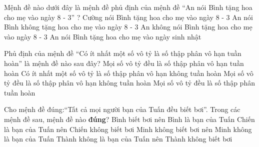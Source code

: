 \begin{ex}%
	Mệnh đề nào dưới đây là mệnh đề phủ định của mệnh đề ``An nói Bình tặng hoa cho mẹ vào ngày 8 - 3'' ?
	\choice
	{Cường nói Bình tặng hoa cho mẹ vào ngày 8 - 3}
	{An nói Bình không tặng hoa cho mẹ vào ngày 8 - 3}
	{\True An không nói Bình tặng hoa cho mẹ vào ngày 8 - 3}
	{An nói Bình tặng hoa cho mẹ vào ngày sinh nhật}
\end{ex}

\begin{ex}%
	Phủ định của mệnh đề ``Có ít nhất một số vô tỷ là số thập phân vô hạn tuần hoàn'' là mệnh đề nào sau đây?
	\choice 
	{Mọi số vô tỷ đều là số thập phân vô hạn tuần hoàn} 
	{Có ít nhất một số vô tỷ là số thập phân vô hạn không tuần hoàn} 
	{\True Mọi số vô tỷ đều là số thập phân vô hạn không tuần hoàn} 
	{Mọi số vô tỷ đều là số thập phân tuần hoàn} 
\end{ex} 

\begin{ex}%
	Cho mệnh đề đúng:``Tất cả mọi người bạn của Tuấn đều biết bơi''. Trong các mệnh đề sau, mệnh đề nào \textbf{đúng}?
	\choice
	{Bình biết bơi nên Bình là bạn của Tuấn}
	{Chiến là bạn của Tuấn nên Chiến không biết bơi }
	{\True Minh không biết bơi nên Minh không là bạn của Tuấn}
	{Thành không là bạn của Tuấn nên Thành không biết bơi}
\end{ex}

